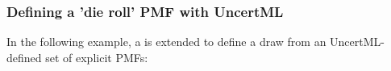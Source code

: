 \documentclass[draftspec]{sbmlpkgspec}
\newcommand{\DrawFromDistribution}{\defRef{DrawFromDistribution}{drawFromDistribution-class}}
\newcommand{\DistribInput}{\defRef{DistribInput}{distribInput-class}}
\begin{document}



\subsubsection{Defining a 'die roll' PMF with UncertML}
In the following example, a \FunctionDefinition is extended to define a draw from an UncertML-defined set of explicit PMFs:
\end{document}
